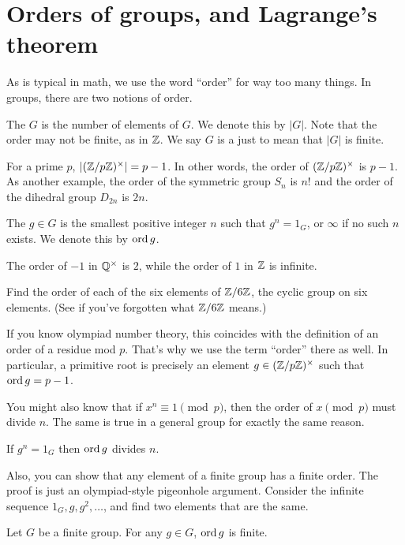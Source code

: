 \section{Orders of groups, and Lagrange's theorem}

As is typical in math, we use the word ``order'' for way too many things.
In groups, there are two notions of order.
\begin{definition}
	The  $G$ is the number of elements of $G$.
	We denote this by $\left\lvert G \right\rvert$.
	Note that the order may not be finite, as in $\mathbb Z$.
	We say $G$ is a  just to mean that $\left\lvert G \right\rvert$ is finite.
\end{definition}
\begin{example}
	For a prime $p$, $\left\lvert (\mathbb Z/p\mathbb Z)^\times \right\rvert = p-1$.
	In other words, the order of $(\mathbb Z/p\mathbb Z)^\times$ is $p-1$.
	As another example,
	the order of the symmetric group $S_n$ is $n!$
	and the order of the dihedral group $D_{2n}$ is $2n$.
\end{example}

\begin{definition}
	The  $g \in G$ is the smallest positive integer $n$
	such that $g^n = 1_G$, or $\infty$ if no such $n$ exists.
	We denote this by $\operatorname{ord} g$.
\end{definition}
\begin{example}
	The order of $-1$ in $\mathbb Q^\times$ is $2$,
	while the order of $1$ in $\mathbb Z$ is infinite.
\end{example}
\begin{ques}
	Find the order of each of the six elements of $\mathbb Z/6\mathbb Z$,
	the cyclic group on six elements.
	(See  if you've forgotten what $\mathbb Z/6\mathbb Z$ means.)
\end{ques}
\begin{example}
	If you know olympiad number theory, this coincides with the definition of an order of a residue mod $p$.
	That's why we use the term ``order'' there as well.
	In particular, a primitive root is precisely an element $g \in (\mathbb Z/p\mathbb Z)^\times$
	such that $\operatorname{ord} g = p-1$.
\end{example}
You might also know that if $x^n \equiv 1 \pmod p$,
then the order of $x \pmod p$ must divide $n$.
The same is true in a general group for exactly the same reason.
\begin{fact}
	If $g^n = 1_G$ then $\operatorname{ord} g$ divides $n$.
\end{fact}
Also, you can show that any element
of a finite group has a finite order.
The proof is just an olympiad-style pigeonhole argument.
Consider the infinite sequence $1_G, g, g^2, \dots$,
and find two elements that are the same.
\begin{fact}
	Let $G$ be a finite group.
	For any $g \in G$, $\operatorname{ord} g$ is finite.
\end{fact}


